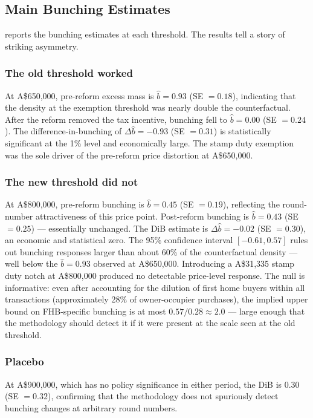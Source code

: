 \documentclass[12pt]{article}
\begin{document}
\subsection{Main Bunching Estimates}

 reports the bunching estimates at each threshold. The results tell a story of striking asymmetry.



\subsubsection*{The old threshold worked} At A\$650,000, pre-reform excess mass is $\hat{b} = 0.93$ (SE $= 0.18$), indicating that the density at the exemption threshold was nearly double the counterfactual. After the reform removed the tax incentive, bunching fell to $\hat{b} = 0.00$ (SE $= 0.24$). The difference-in-bunching of $\Delta\hat{b} = -0.93$ (SE $= 0.31$) is statistically significant at the 1\% level and economically large. The stamp duty exemption was the sole driver of the pre-reform price distortion at A\$650,000.

\subsubsection*{The new threshold did not} At A\$800,000, pre-reform bunching is $\hat{b} = 0.45$ (SE $= 0.19$), reflecting the round-number attractiveness of this price point. Post-reform bunching is $\hat{b} = 0.43$ (SE $= 0.25$) --- essentially unchanged. The DiB estimate is $\Delta\hat{b} = -0.02$ (SE $= 0.30$), an economic and statistical zero. The 95\% confidence interval $[-0.61, 0.57]$ rules out bunching responses larger than about 60\% of the counterfactual density --- well below the $\hat{b} = 0.93$ observed at A\$650,000. Introducing a A\$31,335 stamp duty notch at A\$800,000 produced no detectable price-level response. The null is informative: even after accounting for the dilution of first home buyers within all transactions (approximately 28\% of owner-occupier purchases), the implied upper bound on FHB-specific bunching is at most $0.57 / 0.28 \approx 2.0$ --- large enough that the methodology should detect it if it were present at the scale seen at the old threshold.

\subsubsection*{Placebo} At A\$900,000, which has no policy significance in either period, the DiB is 0.30 (SE $= 0.32$), confirming that the methodology does not spuriously detect bunching changes at arbitrary round numbers.
\end{document}
